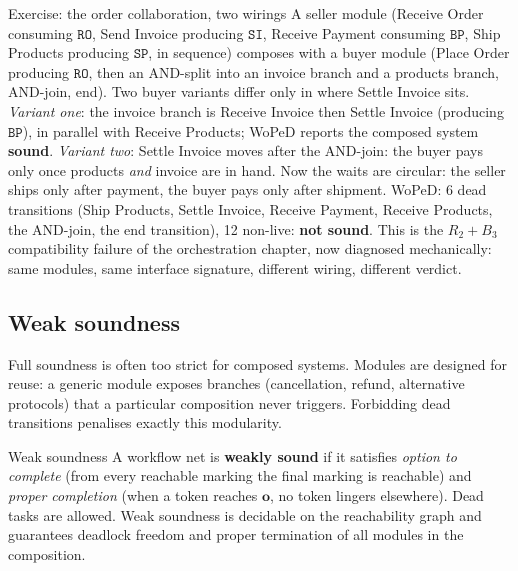 \begin{examplebox}{Exercise: the order collaboration, two wirings}
A seller module (\textsf{Receive Order} consuming $\mathtt{RO}$, \textsf{Send Invoice} producing $\mathtt{SI}$, \textsf{Receive Payment} consuming $\mathtt{BP}$, \textsf{Ship Products} producing $\mathtt{SP}$, in sequence) composes with a buyer module (\textsf{Place Order} producing $\mathtt{RO}$, then an AND-split into an invoice branch and a products branch, AND-join, end). Two buyer variants differ only in where \textsf{Settle Invoice} sits. \emph{Variant one}: the invoice branch is \textsf{Receive Invoice} then \textsf{Settle Invoice} (producing $\mathtt{BP}$), in parallel with \textsf{Receive Products}; WoPeD reports the composed system \textbf{sound}. \emph{Variant two}: \textsf{Settle Invoice} moves after the AND-join: the buyer pays only once products \emph{and} invoice are in hand. Now the waits are circular: the seller ships only after payment, the buyer pays only after shipment. WoPeD: 6 dead transitions (\textsf{Ship Products}, \textsf{Settle Invoice}, \textsf{Receive Payment}, \textsf{Receive Products}, the AND-join, the end transition), 12 non-live: \textbf{not sound}. This is the $R_2 + B_3$ compatibility failure of the orchestration chapter, now diagnosed mechanically: same modules, same interface signature, different wiring, different verdict.
\end{examplebox}

\subsection{Weak soundness}

Full soundness is often too strict for composed systems. Modules are designed for reuse: a generic module exposes branches (cancellation, refund, alternative protocols) that a particular composition never triggers. Forbidding dead transitions penalises exactly this modularity.
\begin{definitionbox}{Weak soundness}
A workflow net is \textbf{weakly sound} if it satisfies \emph{option to complete} (from every reachable marking the final marking is reachable) and \emph{proper completion} (when a token reaches $\mathbf{o}$, no token lingers elsewhere). Dead tasks are allowed. Weak soundness is decidable on the reachability graph and guarantees deadlock freedom and proper termination of all modules in the composition.
\end{definitionbox}

